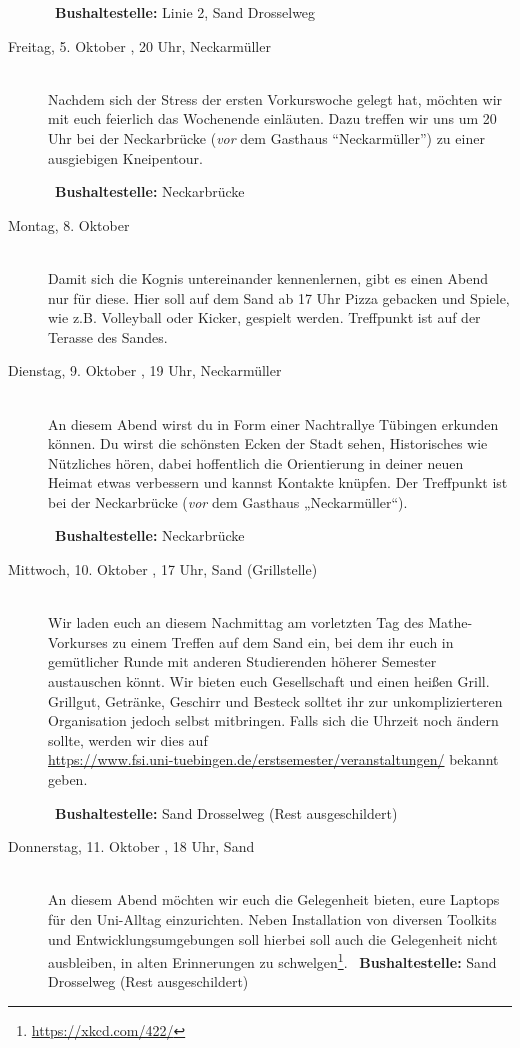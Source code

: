 \begin{description}
~\textbf{Bushaltestelle:} Linie 2, Sand Drosselweg
\fi
\fi


\item[Freitag, 5. Oktober \Jahr, 20 Uhr, Neckarmüller]\ \\
Nachdem sich der Stress der ersten Vorkurswoche gelegt hat, möchten wir mit euch feierlich das Wochenende einläuten. 
Dazu treffen wir uns um 20 Uhr bei der Neckarbrücke (\emph{vor} dem Gasthaus "`Neckarmüller"') zu einer ausgiebigen Kneipentour.

~\textbf{Bushaltestelle:} Neckarbrücke 


\ifkogwiss

\item[Montag, 8. Oktober \Jahr ]\ \\
Damit sich die Kognis untereinander kennenlernen, gibt es einen Abend nur für diese. Hier soll auf dem Sand ab 17 Uhr Pizza gebacken und  Spiele, wie z.B. Volleyball oder Kicker, gespielt werden. 
Treffpunkt ist auf der Terasse des Sandes.
\fi

\item[Dienstag, 9. Oktober \Jahr, 19 Uhr, Neckarmüller]\ \\ 
An diesem Abend wirst du in Form einer Nachtrallye Tübingen erkunden können. Du wirst die schönsten Ecken der Stadt sehen, Historisches wie Nützliches hören, dabei hoffentlich die Orientierung in deiner neuen Heimat etwas verbessern und kannst Kontakte knüpfen. Der Treffpunkt ist bei der Neckarbrücke (\emph{vor} dem Gasthaus „Neckarmüller“).

~\textbf{Bushaltestelle:} Neckarbrücke 

\item[Mittwoch, 10. Oktober \Jahr, 17 Uhr, Sand (Grillstelle)]\ \\
Wir laden euch an diesem Nachmittag am vorletzten Tag des Mathe-Vorkurses zu
einem Treffen auf dem Sand ein, bei dem ihr euch in gemütlicher Runde mit
anderen Studierenden höherer Semester austauschen könnt. Wir bieten euch
Gesellschaft und einen heißen Grill. Grillgut, Getränke, Geschirr und Besteck solltet ihr zur unkomplizierteren Organisation jedoch selbst mitbringen.
Falls sich die Uhrzeit noch ändern sollte, werden wir dies auf \\ \url{https://www.fsi.uni-tuebingen.de/erstsemester/veranstaltungen/} bekannt geben.

~\textbf{Bushaltestelle:} Sand Drosselweg (Rest ausgeschildert)

\item[Donnerstag, 11. Oktober \Jahr, 18 Uhr, Sand]\ \\
An diesem Abend möchten wir euch die Gelegenheit bieten, eure Laptops für den Uni-Alltag einzurichten. Neben Installation von diversen Toolkits und Entwicklungsumgebungen soll hierbei soll auch die Gelegenheit nicht ausbleiben, in alten Erinnerungen zu schwelgen\footnote{\url{https://xkcd.com/422/}}. 
~\textbf{Bushaltestelle:} Sand Drosselweg (Rest ausgeschildert)



\end{description}
